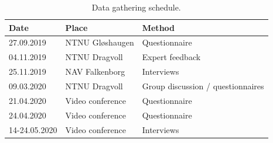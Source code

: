 \begin{table}[H]
\centering
\begin{tabular}{l|l|l}
\toprule
{\textbf{Date}} & { \textbf{Place}} & { \textbf{Method}} \\ 
\midrule
27.09.2019   & NTNU Gløshaugen  &  Questionnaire                \\ 
04.11.2019  & NTNU Dragvoll & Expert feedback                   \\
25.11.2019   & NAV Falkenborg &  Interviews                     \\ 
09.03.2020  & NTNU Dragvoll &  Group discussion / questionnaires\\ 
21.04.2020   & Video conference &  Questionnaire                \\ 
24.04.2020   & Video conference &  Questionnaire                \\ 
14-24.05.2020   & Video conference &  Interviews                \\ 
\bottomrule
\end{tabular}
\caption{Data gathering schedule.}
\label{table:dataGatheringSchedule}
\end{table}


\cleardoublepage